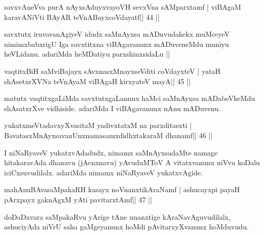 
\begin{shl}
savxvAneVva purA nAyxsAduyxvayoVH sevxVna sAMparxtamf |
viBAgaM karavANiVti BAyAR teVnABayxcoVdayatf\hfill || 44 ||
\end{shl}

\begin{artha}
savxtutx iruvavanAgiyeV idudx saMnAyxsa mADuvudakekx muMceyeV
nimimxbabxrigU Iga savxtitxna viBAgavanunx mADuveneMdu muniyu
heVLidanu. adariMda heMDatiyu parxshinxsidaLu || 
\end{artha}


\begin{shl}
\footnotemark[1]vaqtitxBiH saMviBajayx sAvxnasxMnayxseVditi coVdayxteV |
yataH shAsetxrXVNa teVnAyaM viBAgaH kirxyateV mayA\hfill || 45 ||
\end{shl}

\begin{artha}
matutx vaqtitxgaLiMda savxtutxgaLanunx haMci saMnAyxsa
mADabeVkeMdu shAsatxrXve vidhiside. adariMda I viBAgavanunx nAnu 
mADuvenu. 
\end{artha}


\begin{shl}
yukatxmeVtadavxyXvasitaM yadivxtatxM na parxditasxti |
BavatasxMnAyxsavanUnxnamasamxdidhxtakaraM dhanamf\hfill || 46 ||
\end{shl}

\begin{artha}
I niNaRyaveV yukatxvAdadudx, nimamx saMnAyxsadaMte namage hitakaravAda dhanavu (jAcnxnavu) yAvuduMToV A vitatxvanunx niVvu koDalu iciCxsuvudilalx. adariMda nimamx niNaRyaveV yukatxvAgide.
\end{artha}


\begin{shl}
mahAnuBAvasaMpakaRH kasayx noVnanxtikAraNamf |
ashucayxpi payaH pArxpayx gaknAgxM yAti pavitarxtAmf\hfill || 47 ||
\end{shl}

\begin{artha}
doDaDxvara saMpakaRvu yArige tAne unanxtige kAraNavAguvudilalx, ashuciyAda niVrU saha gaMgeyanunx hoMdi pAvitarxyXvanunx hoMduvudu.
\end{artha}

